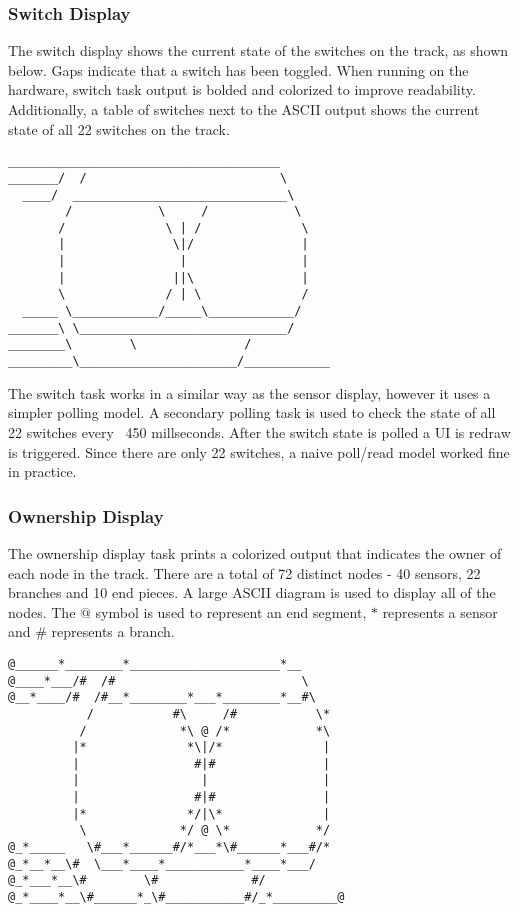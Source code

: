 \documentclass[twoside,a4paper]{refart}
\begin{document}
\subsubsection{Switch Display}
The switch display shows the current state of the switches on the track, as shown below. Gaps indicate that a switch has been toggled. When running on the hardware, switch task output is bolded and colorized to improve readability. Additionally, a table of switches next to the ASCII output shows the current state of all 22 switches on the track.

\begin{verbatim}
______________________________________
_______/  /                           \
  ____/  ______________________________\
        /            \     /            \
       /              \ | /              \
       |               \|/               |
       |                |                |
       |               ||\               |
       \              / | \              /
  _____ \____________/_____\____________/
_______\ \_____________________________/
________\        \               /
_________\______________________/____________
\end{verbatim}

The switch task works in a similar way as the sensor display, however it uses a simpler polling model. A secondary polling task is used to check the state of all 22 switches every ~450 millseconds. After the switch state is polled a UI is redraw is triggered. Since there are only 22 switches, a naive poll/read model worked fine in practice.

\subsubsection{Ownership Display}

The ownership display task prints a colorized output that indicates the owner of each node in the track. There are a total of 72 distinct nodes - 40 sensors, 22 branches and 10 end pieces. A large ASCII diagram is used to display all of the nodes. The $@$ symbol is used to represent an end segment, $*$ represents a sensor and $\#$ represents a branch.

\begin{verbatim}
@______*________*_____________________*__
@____*___/#  /#                          \
@__*____/#  /#__*________*___*________*__#\
           /           #\     /#           \*
          /             *\ @ /*            *\
         |*              *\|/*              |
         |                #|#               |
         |                 |                |
         |                #|#               |
         |*              */|\*              |
          \             */ @ \*            */
@_*_____   \#___*______#/*___*\#______*___#/*
@_*__*__\#  \___*____*___________*____*___/
@_*___*__\#        \#             #/  
@_*____*__\#______*_\#___________#/_*_________@
\end{verbatim}
\end{document}
